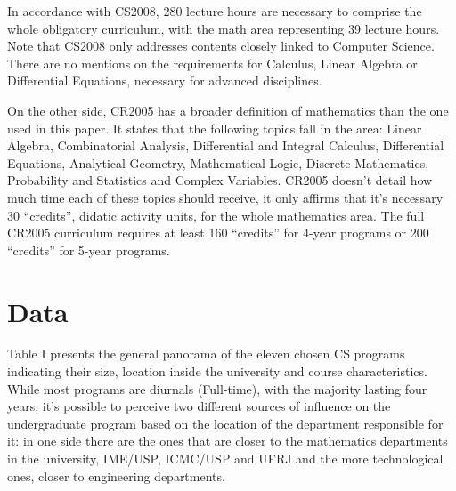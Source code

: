 \documentclass[conference]{IEEEtran}
\begin{document}
	In accordance with CS2008, 280 lecture hours are necessary to comprise the whole obligatory curriculum, with the math area representing 39 lecture hours. \cite{cs2008} Note that CS2008 only addresses contents closely linked to Computer Science. There are no mentions on the requirements for Calculus, Linear Algebra or Differential Equations, necessary for advanced disciplines.

	On the other side, CR2005 has a broader definition of mathematics than the one used in this paper. It states that the following topics fall in the area: Linear Algebra, Combinatorial Analysis, Differential and Integral Calculus, Differential Equations, Analytical Geometry, Mathematical Logic, Discrete Mathematics, Probability and Statistics and Complex Variables. CR2005 doesn't detail how much time each of these topics should receive, it only affirms that it's necessary 30 ``credits'', didatic activity units, for the whole mathematics area. The full CR2005 curriculum requires at least 160 ``credits'' for 4-year programs or 200 ``credits'' for 5-year programs.

\section{Data}
	Table I presents the general panorama of the eleven chosen CS programs indicating their size, location inside the university and course characteristics. While most programs are diurnals (Full-time), with the majority lasting four years, it's possible to perceive two different sources of influence on the undergraduate program based on the location of the department responsible for it: in one side there are the ones that are closer to the mathematics departments in the university, IME/USP, ICMC/USP and UFRJ and the more technological ones, closer to engineering departments.
\end{document}
